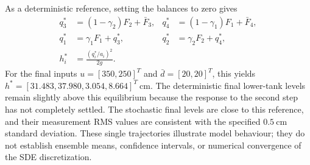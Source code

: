 As a deterministic reference, setting the balances to zero gives
\begin{align}
 q_3^*&=(1-\gamma_2)F_2+\bar F_3,&
 q_4^*&=(1-\gamma_1)F_1+\bar F_4,\\
 q_1^*&=\gamma_1F_1+q_3^*,&
 q_2^*&=\gamma_2F_2+q_4^*,\\
 h_i^*&=\frac{(q_i^*/a_i)^2}{2g}.&&
\end{align}
For the final inputs $u=[350,250]^T$ and $\bar d=[20,20]^T$, this yields
$h^*=[31.483,37.980,3.054,8.664]^T\ \mathrm{cm}$.
The deterministic final lower-tank levels remain slightly above this
equilibrium because the response to the second step has not completely
settled. The stochastic final levels are close to this reference, and
their measurement RMS values are consistent with the specified
$0.5\ \mathrm{cm}$ standard deviation. These single trajectories illustrate
model behaviour; they do not establish ensemble means, confidence
intervals, or numerical convergence of the SDE discretization.



